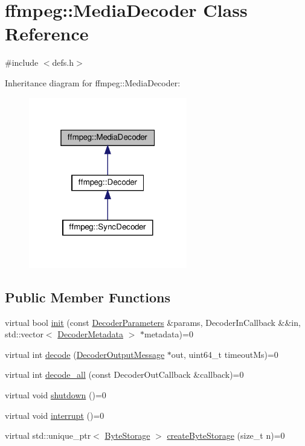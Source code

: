 \hypertarget{classffmpeg_1_1MediaDecoder}{}\section{ffmpeg\+:\+:Media\+Decoder Class Reference}
\label{classffmpeg_1_1MediaDecoder}


{\ttfamily \#include $<$defs.\+h$>$}



Inheritance diagram for ffmpeg\+:\+:Media\+Decoder\+:
\nopagebreak
\begin{figure}[H]
\begin{center}
\leavevmode
\includegraphics[width=196pt]{classffmpeg_1_1MediaDecoder__inherit__graph}
\end{center}
\end{figure}
\subsection*{Public Member Functions}
\begin{DoxyCompactItemize}
\item 
virtual bool \hyperlink{classffmpeg_1_1MediaDecoder_a1e65150d20d7540f8e35ce2d9f13017f}{init} (const \hyperlink{structffmpeg_1_1DecoderParameters}{Decoder\+Parameters} \&params, Decoder\+In\+Callback \&\&in, std\+::vector$<$ \hyperlink{structffmpeg_1_1DecoderMetadata}{Decoder\+Metadata} $>$ $\ast$metadata)=0
\item 
virtual int \hyperlink{classffmpeg_1_1MediaDecoder_a20109fcef8c1c83eece3f30094ae4deb}{decode} (\hyperlink{structffmpeg_1_1DecoderOutputMessage}{Decoder\+Output\+Message} $\ast$out, uint64\+\_\+t timeout\+Ms)=0
\item 
virtual int \hyperlink{classffmpeg_1_1MediaDecoder_acaf4668d2c876ede90eaa3a012b7146d}{decode\+\_\+all} (const Decoder\+Out\+Callback \&callback)=0
\item 
virtual void \hyperlink{classffmpeg_1_1MediaDecoder_a844a205a22a365e6c8945e0a54ca7b66}{shutdown} ()=0
\item 
virtual void \hyperlink{classffmpeg_1_1MediaDecoder_a165ba6847844ec6057ffcb6b7379f2af}{interrupt} ()=0
\item 
virtual std\+::unique\+\_\+ptr$<$ \hyperlink{classffmpeg_1_1ByteStorage}{Byte\+Storage} $>$ \hyperlink{classffmpeg_1_1MediaDecoder_a7a5b9a79eafa82de87c53f6ad1a43071}{create\+Byte\+Storage} (size\+\_\+t n)=0
\end{DoxyCompactItemize}


